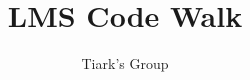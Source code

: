 \documentclass[acmsmall,review]{acmart}\settopmatter{printfolios=false,printccs=false,printacmref=false}
\begin{document}
\title[LMS Code Walk]{LMS Code Walk}         %



\author{Tiark's Group}

\end{document}
